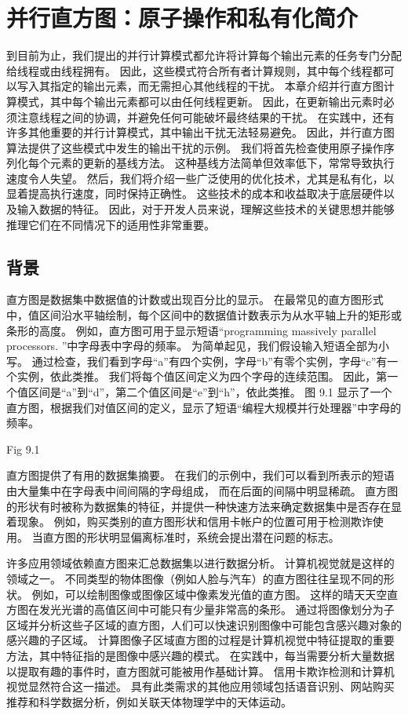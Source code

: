 \section{并行直方图：原子操作和私有化简介}
到目前为止，我们提出的并行计算模式都允许将计算每个输出元素的任务专门分配给线程或由线程拥有。 
因此，这些模式符合所有者计算规则，其中每个线程都可以写入其指定的输出元素，而无需担心其他线程的干扰。 
本章介绍并行直方图计算模式，其中每个输出元素都可以由任何线程更新。 
因此，在更新输出元素时必须注意线程之间的协调，并避免任何可能破坏最终结果的干扰。 
在实践中，还有许多其他重要的并行计算模式，其中输出干扰无法轻易避免。 
因此，并行直方图算法提供了这些模式中发生的输出干扰的示例。 我们将首先检查使用原子操作序列化每个元素的更新的基线方法。 
这种基线方法简单但效率低下，常常导致执行速度令人失望。 
然后，我们将介绍一些广泛使用的优化技术，尤其是私有化，以显着提高执行速度，同时保持正确性。 
这些技术的成本和收益取决于底层硬件以及输入数据的特征。 
因此，对于开发人员来说，理解这些技术的关键思想并能够推理它们在不同情况下的适用性非常重要。

\subsection{背景}
直方图是数据集中数据值的计数或出现百分比的显示。 
在最常见的直方图形式中，值区间沿水平轴绘制，每个区间中的数据值计数表示为从水平轴上升的矩形或条形的高度。 
例如，直方图可用于显示短语“programming massively parallel processors. ”中字母表中字母的频率。 
为简单起见，我们假设输入短语全部为小写。 
通过检查，我们看到字母“a”有四个实例，字母“b”有零个实例，字母“c”有一个实例，依此类推。 
我们将每个值区间定义为四个字母的连续范围。 因此，第一个值区间是“a”到“d”，第二个值区间是“e”到“h”，依此类推。 
图 9.1 显示了一个直方图，根据我们对值区间的定义，显示了短语“编程大规模并行处理器”中字母的频率。

{\color{red} Fig 9.1}

直方图提供了有用的数据集摘要。 在我们的示例中，我们可以看到所表示的短语由大量集中在字母表中间间隔的字母组成，
而在后面的间隔中明显稀疏。 直方图的形状有时被称为数据集的特征，并提供一种快速方法来确定数据集中是否存在显着现象。 
例如，购买类别的直方图形状和信用卡帐户的位置可用于检测欺诈使用。 当直方图的形状明显偏离标准时，系统会提出潜在问题的标志。

许多应用领域依赖直方图来汇总数据集以进行数据分析。 计算机视觉就是这样的领域之一。 
不同类型的物体图像（例如人脸与汽车）的直方图往往呈现不同的形状。 例如，可以绘制图像或图像区域中像素发光值的直方图。 
这样的晴天天空直方图在发光光谱的高值区间中可能只有少量非常高的条形。 
通过将图像划分为子区域并分析这些子区域的直方图，人们可以快速识别图像中可能包含感兴趣对象的感兴趣的子区域。 
计算图像子区域直方图的过程是计算机视觉中特征提取的重要方法，其中特征指的是图像中感兴趣的模式。 
在实践中，每当需要分析大量数据以提取有趣的事件时，直方图就可能被用作基础计算。 信用卡欺诈检测和计算机视觉显然符合这一描述。 
具有此类需求的其他应用领域包括语音识别、网站购买推荐和科学数据分析，例如关联天体物理学中的天体运动。

